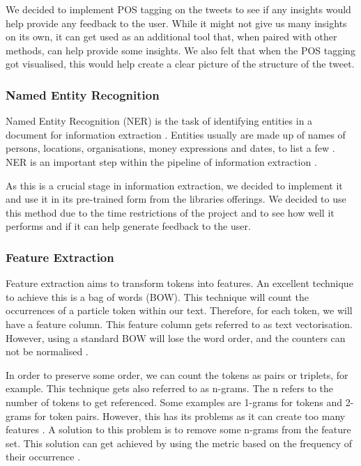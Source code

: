 	We decided to implement POS tagging on the tweets to see if any insights would help provide any feedback to the user. While it might not give us many insights on its own, it can get used as an additional tool that, when paired with other methods, can help provide some insights. We also felt that when the POS tagging got visualised, this would help create a clear picture of the structure of the tweet.
	
	
	\subsubsection{Named Entity Recognition}
	Named Entity Recognition (NER) is the task of identifying entities in a document for information extraction \cite{vajjala2020practical}. Entities usually are made up of names of persons, locations, organisations, money expressions and dates, to list a few \cite{hapke2019natural}. NER is an important step within the pipeline of information extraction \cite{vajjala2020practical}.
	
	As this is a crucial stage in information extraction, we decided to implement it and use it in its pre-trained form from the libraries offerings. We decided to use this method due to the time restrictions of the project and to see how well it performs and if it can help generate feedback to the user.
	
	
	\subsubsection{Feature Extraction}
	Feature extraction aims to transform tokens into features. An excellent technique to achieve this is a bag of words (BOW). This technique will count the occurrences of a particle token within our text. Therefore, for each token, we will have a feature column. This feature column gets referred to as text vectorisation. However, using a standard BOW will lose the word order, and the counters can not be normalised \cite{hapke2019natural}. 
	
	In order to preserve some order, we can count the tokens as pairs or triplets, for example. This technique gets also referred to as n-grams. The n refers to the number of tokens to get referenced. Some examples are 1-grams for tokens and 2-grams for token pairs. However, this has its problems as it can create too many features \cite{vajjala2020practical}. A solution to this problem is to remove some n-grams from the feature set. This solution can get achieved by using the metric based on the frequency of their occurrence \cite{vajjala2020practical}.
	
